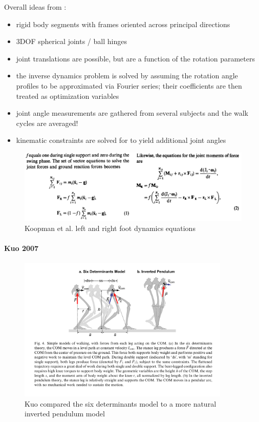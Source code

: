 \documentclass[11pt]{article}
\begin{document}
Overall ideas from \cite{Koopman1995}:
\begin{itemize}
\item rigid body segments with frames oriented across principal directions
\item 3DOF spherical joints / ball hinges
\item joint translations are possible, but are a function of the rotation parameters
\item the inverse dynamics problem is solved by assuming the rotation angle profiles to be approximated via
Fourier series; their coefficients are then treated as optimization variables
\item joint angle measurements are gathered from several subjects and the walk cycles are averaged!
\item kinematic constraints are solved for to yield additional joint angles
\end{itemize}

\begin{figure}[H]
\includegraphics[scale=0.5]{images/koopman_equations.png}
\caption{Koopman et al. \cite{Koopman1995} left and right foot dynamics equations}
\end{figure}

\paragraph{Kuo 2007 \cite{Kuo2007}}

\begin{figure}[H]
\includegraphics[width=0.9\textwidth]{images/kuo_inv_pendulum.png}
\caption{Kuo \cite{Kuo2007} compared the six determinants model to a more natural inverted pendulum model}
\end{figure}
\end{document}
